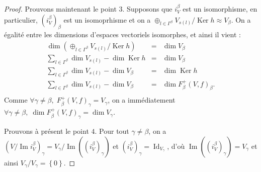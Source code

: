 \documentclass[a4paper,10pt]{article}
\DeclareMathOperator{\Ker}{Ker}
\DeclareMathOperator{\Id}{Id}
\DeclareMathOperator{\Img}{Im}
\begin{document}
\begin{proof}
	Prouvons maintenant le point $3$. Supposons que $i_{V}^{\beta}$ est un isomorphisme, en particulier, $(i_{V}^{\beta})_{\beta}$ est un isomoprhisme et on a $\oplus_{l\in\Gamma^{\beta}}V_{s(l)}/\Ker h\approx V_{\beta}$. On a égalité entre les dimensions d'espaces vectoriels isomorphes, et ainsi il vient :
	\[
\begin{array}{rll}
	\dim(\oplus_{l\in\Gamma^{\beta}}V_{s(l)}/\Ker h) &=& \dim V_{\beta}\\
	\sum_{l\in\Gamma^{\beta}}\dim V_{s(l)}-\dim\Ker h &=& \dim V_{\beta}\\
	\sum_{l\in\Gamma^{\beta}}\dim V_{s(l)}-\dim V_{\beta} &=& \dim\Ker h\\
	\sum_{l\in\Gamma^{\beta}}\dim V_{s(l)}-\dim V_{\beta} &=& \dim F_{\beta}^{+}(V,f)_{\beta}.\\
\end{array}
	\]
	Comme $\forall \gamma\neq\beta,\;F_{\beta}^{+}(V,f)_{\gamma}=V_{\gamma}$, on a immédiatement $\forall \gamma\neq\beta,\;\dim F_{\beta}^{+}(V,f)_{\gamma}=\dim V_{\gamma}$.

	Prouvons à présent le point $4$. Pour tout $\gamma\neq\beta$, on a $(V/\Img i_{V}^{\beta})_{\gamma}=V_{\gamma}/\Img((i_{V}^{\beta})_{\gamma})$ et $(i_{V}^{\beta})_{\gamma}=\Id_{V_{\gamma}}$, d'où $\Img((i_{V}^{\beta})_{\gamma})=V_{\gamma}$ et ainsi $V_{\gamma}/V_{\gamma}=\left\{ 0 \right\}$.


\end{proof}
\end{document}
